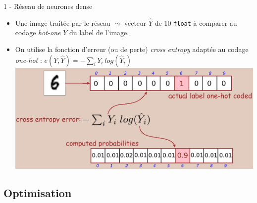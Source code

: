 \documentclass[10pt,serif,mathserif,compress,hyperref={colorlinks}]{beamer}
\begin{document}
\begin{frame}{1 - Réseau de neurones dense}

  \begin{tcolorbox}[title=Fonction d'erreur : {\em Cross entropy error}]  

    \begin{itemize}
    \item Une image traitée par le réseau $\leadsto$ vecteur $\hat{Y}$ de 10 \texttt{float} à comparer au codage {\em hot-one} $Y$ du label de l'image.
    \item On utilise la fonction d'erreur (ou de perte) {\em cross entropy} adaptée au codage {\em one-hot} : $e(Y,\hat{Y})=-\sum_i Y_i\ log(\hat{Y}_i)$\\
      \includegraphics[width=.9\textwidth]{images/CrossEntropyError.png}
    \end{itemize}

  \end{tcolorbox}
  
\end{frame}

\subsection{Optimisation}
\end{document}
